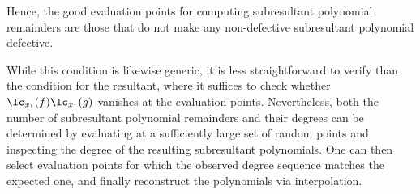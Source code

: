 Hence, the good evaluation points for computing subresultant polynomial remainders are those that do not make any non-defective subresultant polynomial defective.

While this condition is likewise generic, it is less straightforward to verify than the condition for the resultant, where it suffices to check whether $\lc_{x_1}(f)\lc_{x_1}(g)$ vanishes at the evaluation points. Nevertheless, both the number of subresultant polynomial remainders and their degrees can be determined by evaluating at a sufficiently large set of random points and inspecting the degree of the resulting subresultant polynomials. One can then select evaluation points for which the observed degree sequence matches the expected one, and finally reconstruct the polynomials via interpolation.

